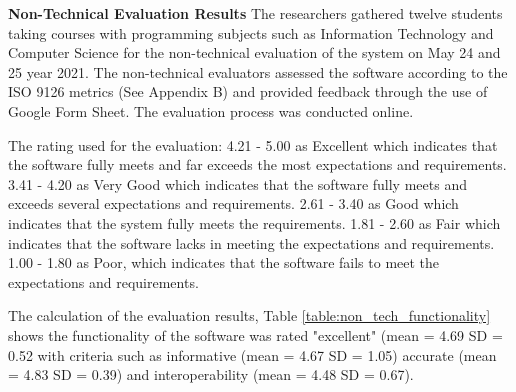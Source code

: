 \flushleft
\textbf{Non-Technical Evaluation Results}
\justifying
\parx
The researchers gathered twelve students taking courses with programming
subjects such as Information Technology and Computer Science for the non-technical
evaluation of the system on May 24 and 25 year 2021. The non-technical evaluators
assessed the software according to the ISO 9126 metrics (See Appendix B) and
provided feedback through the use of Google Form Sheet. The evaluation process was
conducted online.

\parx
The rating used for the evaluation: 4.21 - 5.00 as Excellent which indicates that the
software fully meets and far exceeds the most expectations and requirements.
3.41 - 4.20 as Very Good which indicates that the software fully meets and exceeds
several expectations and requirements. 2.61 - 3.40 as Good which indicates that the
system fully meets the requirements. 1.81 - 2.60 as Fair which indicates that the software
lacks in meeting the expectations and requirements. 1.00 - 1.80 as Poor, which
indicates that the software fails to meet the expectations and requirements.

\parx
The calculation of the evaluation results, Table \ref{table:non_tech_functionality} shows the
functionality of the software was rated "excellent" (mean = 4.69 SD = 0.52 with criteria
such as informative (mean = 4.67 SD = 1.05) accurate (mean = 4.83 SD = 0.39)
and interoperability (mean = 4.48 SD = 0.67).


